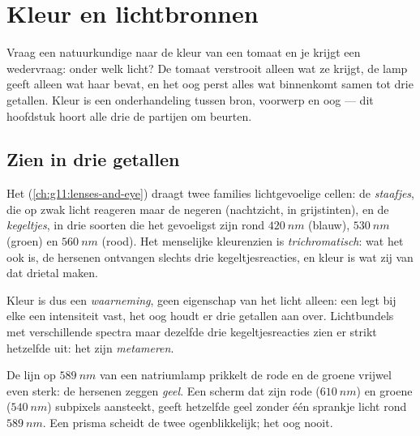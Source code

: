 \chapter{Kleur en lichtbronnen}\label{ch:g11:color-light-sources}

Vraag een natuurkundige naar de kleur van een tomaat en je krijgt een
wedervraag: onder welk licht? De tomaat verstrooit alleen wat ze krijgt,
de lamp geeft alleen wat haar  bevat, en het oog perst alles wat
binnenkomt samen tot drie getallen. Kleur is een onderhandeling tussen
bron, voorwerp en oog --- dit hoofdstuk hoort alle drie de partijen om
beurten.

\section{Zien in drie getallen}

\begin{definition}\label{def:g11:color-light-sources:cones}
Het  (\cref{ch:g11:lenses-and-eye}) draagt twee families
lichtgevoelige cellen: de \emph{staafjes}, die op zwak
licht reageren maar de  negeren (nachtzicht, in grijstinten),
en de \emph{kegeltjes}, in drie soorten die het
gevoeligst zijn rond $\qty{420}{nm}$ (blauw), $\qty{530}{nm}$ (groen) en
$\qty{560}{nm}$ (rood). Het menselijke kleurenzien is
\emph{trichromatisch}: wat het  ook
is, de hersenen ontvangen slechts drie kegeltjesreacties, en kleur is
wat zij van dat drietal maken.
\end{definition}

\begin{definition}\label{def:g11:color-light-sources:perception}
Kleur is dus een \emph{waarneming}, geen eigenschap van het licht
alleen: een  legt bij elke  een intensiteit vast, het
oog houdt er drie getallen aan over. Lichtbundels met verschillende
spectra maar dezelfde drie kegeltjesreacties zien er strikt hetzelfde
uit: het zijn \emph{metameren}.
\end{definition}

\begin{example}\label{ex:g11:color-light-sources:yellows}
De lijn op $\qty{589}{nm}$ van een natriumlamp prikkelt de rode en de
groene  vrijwel even sterk: de hersenen zeggen \emph{geel}. Een
scherm dat zijn rode ($\qty{610}{nm}$) en groene ($\qty{540}{nm}$)
subpixels aansteekt, geeft hetzelfde geel zonder één sprankje licht rond
$\qty{589}{nm}$. Een prisma scheidt de twee ogenblikkelijk; het oog
nooit.
\end{example}

